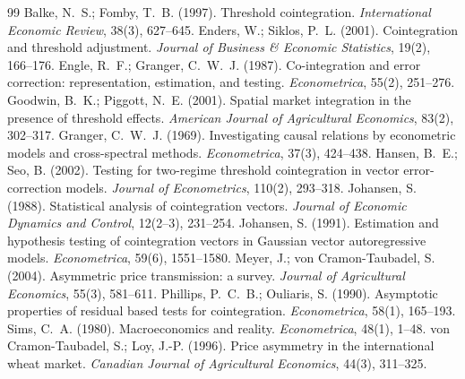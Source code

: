 \documentclass[12pt,a4paper]{article}
\begin{document}
\begin{thebibliography}{99}
 Balke, N.~S.; Fomby, T.~B. (1997). Threshold cointegration.
\textit{International Economic Review}, 38(3), 627--645.
 Enders, W.; Siklos, P.~L. (2001). Cointegration and threshold
adjustment. \textit{Journal of Business \& Economic Statistics}, 19(2), 166--176.
 Engle, R.~F.; Granger, C.~W.~J. (1987). Co-integration and error
correction: representation, estimation, and testing. \textit{Econometrica}, 55(2),
251--276.
 Goodwin, B.~K.; Piggott, N.~E. (2001). Spatial market integration
in the presence of threshold effects. \textit{American Journal of Agricultural
Economics}, 83(2), 302--317.
 Granger, C.~W.~J. (1969). Investigating causal relations by
econometric models and cross-spectral methods. \textit{Econometrica}, 37(3), 424--438.
 Hansen, B.~E.; Seo, B. (2002). Testing for two-regime threshold
cointegration in vector error-correction models. \textit{Journal of Econometrics},
110(2), 293--318.
 Johansen, S. (1988). Statistical analysis of cointegration
vectors. \textit{Journal of Economic Dynamics and Control}, 12(2--3), 231--254.
 Johansen, S. (1991). Estimation and hypothesis testing of
cointegration vectors in Gaussian vector autoregressive models. \textit{Econometrica},
59(6), 1551--1580.
 Meyer, J.; von Cramon-Taubadel, S. (2004). Asymmetric price
transmission: a survey. \textit{Journal of Agricultural Economics}, 55(3), 581--611.
 Phillips, P.~C.~B.; Ouliaris, S. (1990). Asymptotic properties of
residual based tests for cointegration. \textit{Econometrica}, 58(1), 165--193.
 Sims, C.~A. (1980). Macroeconomics and reality.
\textit{Econometrica}, 48(1), 1--48.
 von Cramon-Taubadel, S.; Loy, J.-P. (1996). Price asymmetry in the
international wheat market. \textit{Canadian Journal of Agricultural Economics}, 44(3),
311--325.
\end{thebibliography}
\end{document}
